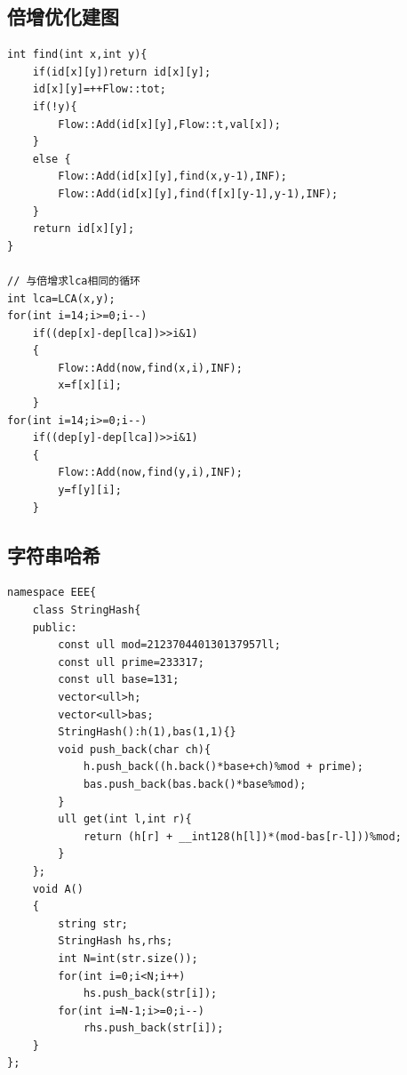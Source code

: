 \documentclass[12pt, a4paper, oneside]{ctexart}
\begin{document}
\newpage 
\subsection{倍增优化建图} 
\begin{lstlisting}
int find(int x,int y){
    if(id[x][y])return id[x][y];
    id[x][y]=++Flow::tot;
    if(!y){
        Flow::Add(id[x][y],Flow::t,val[x]);
    }
    else {
        Flow::Add(id[x][y],find(x,y-1),INF);
        Flow::Add(id[x][y],find(f[x][y-1],y-1),INF);
    }
    return id[x][y];
}
​
// 与倍增求lca相同的循环
int lca=LCA(x,y);
for(int i=14;i>=0;i--)
    if((dep[x]-dep[lca])>>i&1)
    {
        Flow::Add(now,find(x,i),INF);
        x=f[x][i];
    }
for(int i=14;i>=0;i--)
    if((dep[y]-dep[lca])>>i&1)
    {
        Flow::Add(now,find(y,i),INF);
        y=f[y][i];
    }
\end{lstlisting}


\newpage 
\subsection{字符串哈希} 
\begin{lstlisting}
namespace EEE{
	class StringHash{
	public:
		const ull mod=212370440130137957ll;
		const ull prime=233317;
		const ull base=131;
		vector<ull>h;
		vector<ull>bas;
		StringHash():h(1),bas(1,1){}
		void push_back(char ch){
			h.push_back((h.back()*base+ch)%mod + prime);
			bas.push_back(bas.back()*base%mod);
		}
		ull get(int l,int r){
			return (h[r] + __int128(h[l])*(mod-bas[r-l]))%mod;
		}
	};
	void A()
	{
		string str;
		StringHash hs,rhs;
		int N=int(str.size());
		for(int i=0;i<N;i++)
			hs.push_back(str[i]);
		for(int i=N-1;i>=0;i--)
			rhs.push_back(str[i]);
	}
};
\end{lstlisting}

\newpage 
\end{document}
